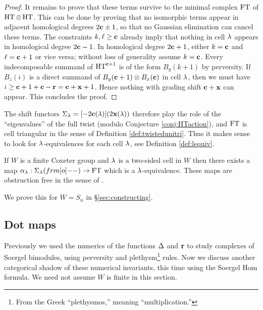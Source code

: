 \begin{proof}
It remains to prove that these terms survive to the minimal complex $\operatorname{FT}$ of $\operatorname{HT} \otimes \operatorname{HT}$.  This can be done by proving that no isomorphic terms appear in adjacent homological degrees $2\mathbf{c} \pm 1$, so that no Gaussian elimination can cancel these terms.  The constraints $k, \ell \ge \mathbf{c}$ already imply that nothing in cell $\lambda$ appears in homological degree $2\mathbf{c}-1$. In homological degree $2\mathbf{c}+1$, either $k = \mathbf{c}$ and $\ell = \mathbf{c} + 1$ or vice versa; without loss of generality assume $k = \mathbf{c}$.  Every indecomposable summand of $\operatorname{HT}^{\mathbf{c}+1}$ is of the form $B_y(k+1)$ by perversity.   If $B_z(i)$ is a direct summand of $B_y(\mathbf{c}+1) \otimes B_x(\mathbf{c})$ in cell $\lambda$, then we must have $i\geq \mathbf{c}+1 + \mathbf{c} - \mathbf{r} = \mathbf{c} + \mathbf{x} +1$.  Hence nothing with grading shift $\mathbf{c} + \mathbf{x}$ can appear. This concludes the proof.
\end{proof}


The shift functors $\Sigma_\lambda=[-2\mathbf{c}(\lambda)](2\mathbf{x}(\lambda))$ therefore play the role of the ``eigenvalues'' of the full twist (modulo Conjecture \ref{conj:HTaction}), and $\operatorname{FT}$ is
cell triangular in the sense of Definition \ref{def:twistedunitri}. Thus it makes sense to look for $\lambda$-equivalences for each cell $\lambda$, see Definition \ref{def:lequiv}.

\begin{conjecture}\label{conj:eigenmap}
If $W$ is a finite Coxeter group and $\lambda$ is a two-sided cell in $W$ then there exists a map $\a_\l:\Sigma_\l(\one)\rightarrow \FT$ which is a $\lambda$-equivalence.  These maps are obstruction free in the sense of \cite[Definition 6.12]{ElHog16a}.
\end{conjecture}

We prove this for $W=S_n$ in \S \ref{sec:constructing}.








\subsection{Dot maps}
\label{subsec:dots}

Previously we used the numerics of the functions $\Delta$ and $\mathbf{r}$ to study complexes of Soergel bimodules, using perversity and plethysm\footnote{From the Greek ``plethysmos,'' meaning ``multiplication.''} rules. Now we discuss another categorical shadow of these numerical invariants, this time using the Soergel Hom formula. We need not assume $W$ is finite in this section.

